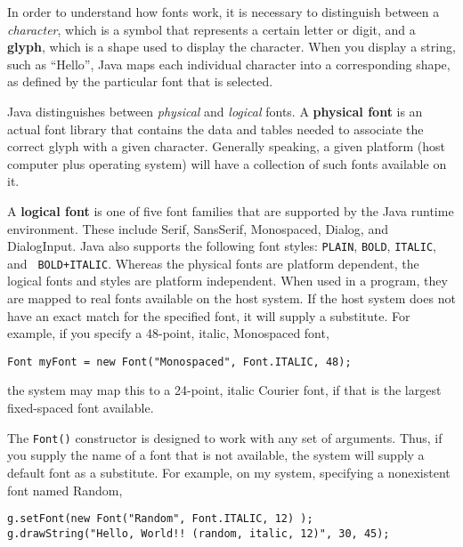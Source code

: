 In order to understand how fonts work, it is necessary to distinguish
between a {\em character}, which is a symbol that represents a certain
letter or digit, and a {\bf glyph}, which is a shape used to display
the character.  When you display a string, such as ``Hello'', Java
maps each individual character into a corresponding shape, as defined
by the particular font that is selected. 

Java distinguishes between {\em physical} and {\em logical} fonts.  A
{\bf physical font} is an actual font library that contains the data
and tables needed to associate the correct glyph with a given
character.  Generally speaking, a given platform (host computer plus
operating system) will have a collection of such fonts available on
it.

A {\bf logical font} is one of five font families that are supported
by the Java runtime environment. These include Serif, SansSerif,
Monospaced, Dialog, and DialogInput.  Java also supports the following
font styles: {\tt PLAIN}, {\tt BOLD}, {\tt ITALIC}, and {\tt
BOLD+ITALIC}.  Whereas the physical fonts are platform dependent, the
logical fonts and styles are platform independent. When used in a
program, they are mapped to real fonts available on the host system.
If the host system does not have an exact match for the specified
font, it will supply a substitute.  For example, if you specify a
48-point, italic, Monospaced font,

\begin{jjjlisting}
\begin{lstlisting}
Font myFont = new Font("Monospaced", Font.ITALIC, 48);
\end{lstlisting}
\end{jjjlisting}

\noindent the system may map this to a 24-point, italic
Courier font, if that is the largest fixed-spaced font available.

The {\tt Font()} constructor is designed to work with any set of
arguments.  Thus, if you supply the name of a font that is not
available, the system will supply a default font as a substitute.  For
example, on my system, specifying a nonexistent font named Random,

\begin{jjjlisting}
\begin{lstlisting}
g.setFont(new Font("Random", Font.ITALIC, 12) );
g.drawString("Hello, World!! (random, italic, 12)", 30, 45);
\end{lstlisting}
\end{jjjlisting}

